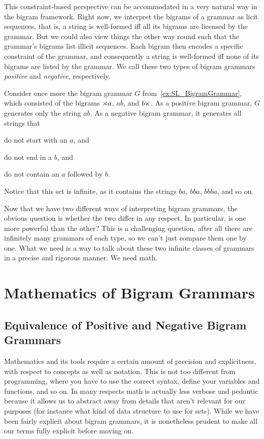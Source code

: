 This constraint-based perspective can be accommodated in a very natural way in the bigram framework.
Right now, we interpret the bigrams of a grammar as licit sequences, that is, a string is well-formed iff all its bigrams are licensed by the grammar. 
But we could also view things the other way round such that the grammar's bigrams list illicit sequences.
Each bigram then encodes a specific constraint of the grammar, and consequently a string is well-formed iff none of its bigrams are listed by the grammar.
We call these two types of bigram grammars \emph{positive} and \emph{negative}, respectively.
%
\begin{examplebox}
    Consider once more the bigram grammar $G$ from~\ref{ex:SL_BigramGrammar}, which consisted of the bigrams $\rtimes a$, $\mathit{ab}$, and $b \ltimes$.
    As a positive bigram grammar, $G$ generates only the string $\mathit{ab}$.
    As a negative bigram grammar, it generates all strings that
    \begin{itemize*}
        \item do not start with an $a$, and
        \item do not end in a $b$, and
        \item do not contain an $a$ followed by $b$.
    \end{itemize*}
    Notice that this set is infinite, as it contains the strings $\mathit{ba}$, $\mathit{bba}$, $\mathit{bbba}$, and so on.
\end{examplebox}

Now that we have two different ways of interpreting bigram grammars, the obvious question is whether the two differ in any respect.
In particular, is one more powerful than the other?
This is a challenging question, after all there are infinitely many grammars of each type, so we can't just compare them one by one.
What we need is a way to talk about these two infinite classes of grammars in a precise and rigorous manner.
We need math.


\section{Mathematics of Bigram Grammars}

\subsection{Equivalence of Positive and Negative Bigram Grammars}

Mathematics and its tools require a certain amount of precision and explicitness, with respect to concepts as well as notation.
This is not too different from programming, where you have to use the correct syntax, define your variables and functions, and so on.
In many respects math is actually less verbose and pedantic because it allows us to abstract away from details that aren't relevant for our purposes (for instance what kind of data structure to use for sets).
While we have been fairly explicit about bigram grammars, it is nonetheless prudent to make all our terms fully explicit before moving on.

